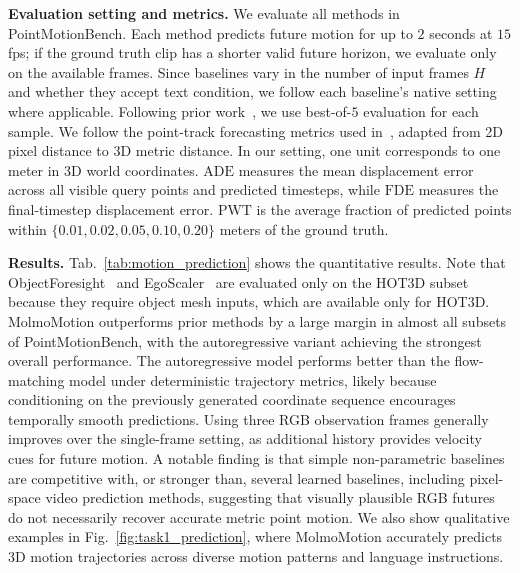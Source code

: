 \documentclass{llmxive}
\providecommand{\modelname}{MolmoMotion\xspace}
\providecommand{\benchmarkname}{PointMotionBench\xspace}
\begin{document}
\noindent \textbf{Evaluation setting and metrics.}
We evaluate all methods in \benchmarkname{}. Each method predicts future motion for up to $2$ seconds at $15$ fps; if the ground truth clip has a shorter valid future horizon, we evaluate only on the available frames. Since baselines vary in the number of input frames $H$ and whether they accept text condition, we follow each baseline's native setting where applicable. 
Following prior work~\cite{thakkar2026forecastingmotion}, we use best-of-$5$ evaluation for each sample.
We follow the point-track forecasting metrics used in~\cite{thakkar2026forecastingmotion}, adapted from 2D pixel distance to 3D metric distance. In our setting, one unit corresponds to one meter in 3D world coordinates. $\mathrm{ADE}$ measures the mean displacement error across all visible query points and predicted timesteps, while $\mathrm{FDE}$ measures the final-timestep displacement error. $\mathrm{PWT}$ is the average fraction of predicted points within $\{0.01,0.02,0.05,0.10,0.20\}$ meters of the ground truth. 


\noindent\textbf{Results.} 
Tab.~\ref{tab:motion_prediction} shows the quantitative results. Note that ObjectForesight~\cite{soraki2026objectforesightpredictingfuture3d} and EgoScaler~\cite{Yoshida_2025_CVPR} are evaluated only on the HOT3D subset because they require object mesh inputs, which are available only for HOT3D. \modelname outperforms prior methods by a large margin in almost all subsets of \benchmarkname{}, with the autoregressive variant achieving the strongest overall performance.
The autoregressive model performs better than the flow-matching model under deterministic trajectory metrics, likely because conditioning on the previously generated coordinate sequence encourages temporally smooth predictions. Using three RGB observation frames generally improves over the single-frame setting, as additional history provides velocity cues for future motion. A notable finding is that simple non-parametric baselines are competitive with, or stronger than, several learned baselines, including pixel-space video prediction methods, suggesting that visually plausible RGB futures do not necessarily recover accurate metric point motion. 
We also show qualitative examples in Fig.~\ref{fig:task1_prediction}, where \modelname accurately predicts 3D motion trajectories across diverse motion patterns and language instructions.
\end{document}
